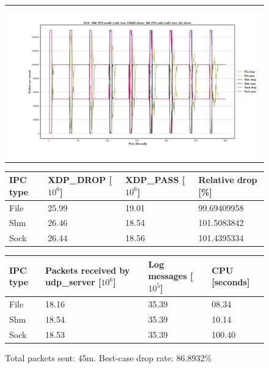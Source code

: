 \begin{figure}[!h]
	\centering
	\scriptsize
	\begin{tabular}{c}
    	\centerline{\includegraphics[width=1.2\textwidth]{images/IPv4_100k_131068_1.png}}
	\end{tabular}
	\begin{tabular}{llll}
		\toprule
		\textbf{IPC type} & \textbf{XDP\_DROP [$10^6$]} & \textbf{XDP\_PASS [$10^6$]} & \textbf{Relative drop [\%]} \\ \midrule 
		File & 25.99 & 19.01 & 99.69409958 \\
        Shm & 26.46 & 18.54 & 101.5083842 \\
        Sock & 26.44 & 18.56 & 101.4395334 \\
	\bottomrule
	\end{tabular}
    \begin{tabular}{llll}
		\toprule
		\textbf{IPC type} & \textbf{Packets received by udp\_server [$10^6$]} & \textbf{Log messages [$10^5$]} & \textbf{CPU [seconds]} \\ \midrule 
		File & 18.16 & 35.39 & 08.34 \\
        Shm & 18.54 & 35.39 & 10.14 \\
        Sock & 18.53 & 35.39 & 100.40 \\
	\bottomrule
	\end{tabular}
	\caption[Simplefail2ban, IPv4, 100k \ac{PPS}, 131,068 malicious clients]{Total packets sent: 45m. Best-case drop rate: 86.8932\%}
	\label{fig:data:ipv4:100k:131068}
\end{figure}

